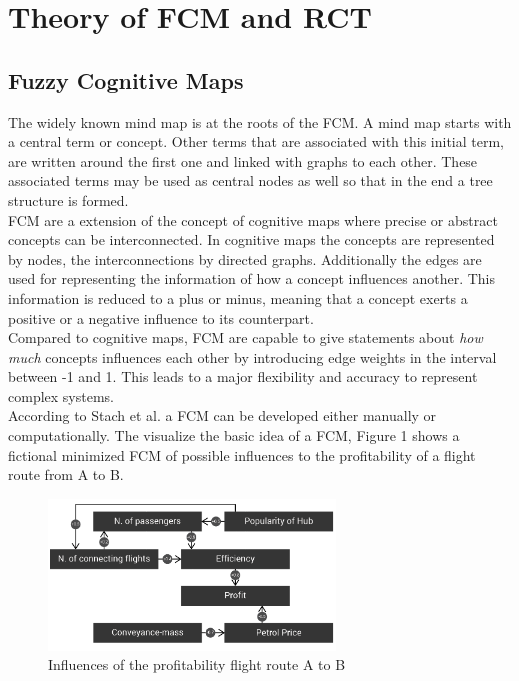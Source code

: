 \documentclass[conference]{IEEEtran}
\begin{document}
\section{Theory of FCM and RCT}
\subsection{Fuzzy Cognitive Maps}
The widely known mind map is at the roots of the FCM. A mind map starts with a central term or concept. Other terms that are associated with this initial term, are written around the first one and linked with graphs to each other. These associated terms may be used as central nodes as well so that in the end a tree structure is formed.\\
FCM are a extension of the concept of cognitive maps where precise or abstract concepts can be interconnected\cite{kosko1986}. In cognitive maps the concepts are represented by nodes, the interconnections by directed graphs. Additionally the edges are used for representing the information of how a concept influences another. This information is reduced to a plus or minus, meaning that a concept exerts a positive or a negative influence to its counterpart.\\
Compared to cognitive maps, FCM are capable to give statements about \emph{how much} concepts influences each other by introducing edge weights in the interval between -1 and 1. This leads to a major flexibility and accuracy to represent complex systems. 
\\According to Stach et al. \cite{stach2005} a FCM can be developed either manually or computationally. The visualize the basic idea of a FCM, Figure 1 shows a fictional minimized FCM of possible influences to the profitability of a flight route from A to B.

\begin{figure}[ht]
\includegraphics[width=3in]{img/ficFCM.png}
\caption{Influences of the profitability flight route A to B}
\label{fig:cm}
\end{figure}
\end{document}

